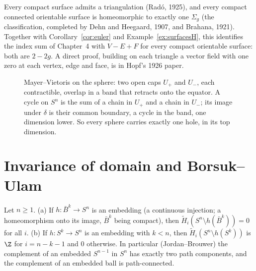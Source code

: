 \begin{remark}
Every compact surface admits a triangulation (Rad\'o, 1925), and every compact connected orientable surface is homeomorphic to exactly one $\Sigma_g$ (the classification, completed by Dehn and Heegaard,
1907, and Brahana, 1921). Together with Corollary~\ref{cor:euler} and Example~\ref{ex:surfacesH}, this identifies the index sum of Chapter~4 with $V-E+F$ for every compact orientable surface:
both are $2-2g$. A direct proof, building on each triangle a vector field with one zero at each vertex, edge and face, is in Hopf's 1926 paper.
\end{remark}

\begin{figure}[ht]
\centering
{}
\caption{Mayer--Vietoris on the sphere: two open caps $U_+$ and $U_-$, each contractible, overlap in a band that retracts onto the equator. A cycle on $S^n$ is the sum of a chain in $U_+$
and a chain in $U_-$; its image under $\delta$ is their common boundary, a cycle in the band, one dimension lower. So every sphere carries exactly one hole, in its top dimension.}
\label{fig:mvsphere}
\end{figure}

\section{Invariance of domain and Borsuk--Ulam}

\begin{proposition}\label{prop:jordanbrouwer}
Let $n\ge1$. (a) If $h\colon\bar B^k\to S^n$ is an embedding (a continuous injection; a homeomorphism onto its image, $\bar B^k$ being compact), then $\tilde H_i(S^n\setminus h(\bar B^k))=0$ for all $i$.
(b) If $h\colon S^k\to S^n$ is an embedding with $k<n$, then $\tilde H_i(S^n\setminus h(S^k))$ is $\Z$ for $i=n-k-1$ and $0$ otherwise. In particular (Jordan--Brouwer) the complement of an embedded $S^{n-1}$
in $S^n$ has exactly two path components, and the complement of an embedded ball is path-connected.
\end{proposition}

